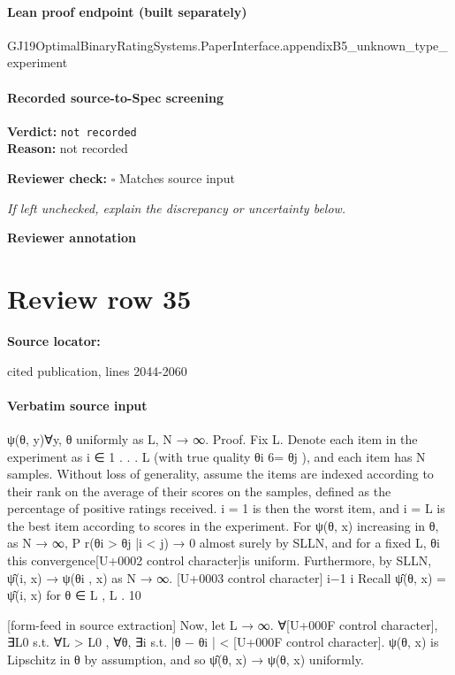 \documentclass[10pt]{article}
\newcommand{\reviewerbox}{%
  \par\noindent\fbox{\parbox{0.96\linewidth}{\rule{0pt}{0.38in}}}\par
}
\newcommand{\reviewmatch}[1]{%
  \par\noindent\textbf{Reviewer check:} $\square$\; #1\par
  \noindent\emph{If left unchecked, explain the discrepancy or uncertainty below.}\par
}
\begin{document}
\paragraph{Lean proof endpoint (built separately)}\begin{ReviewVerbatim}
GJ19OptimalBinaryRatingSystems.PaperInterface.appendixB5_unknown_type_experiment
\end{ReviewVerbatim}

\paragraph{Recorded source-to-Spec screening}
\textbf{Verdict:} \texttt{not recorded}
\\
\textbf{Reason:} not recorded
\reviewmatch{Matches source input}
\noindent\textbf{Reviewer annotation}\par
\reviewerbox
\clearpage
\hypertarget{source-claim-045f11cd1b489b98}{}
\section*{Review row 35}
\textbf{Source locator:} {\footnotesize\raggedright cited publication, lines 2044-\allowbreak{}2060\par}
\paragraph{Verbatim source input}
\begin{ReviewVerbatim}
ψ(θ, y)∀y, θ uniformly as L, N → ∞.
Proof. Fix L. Denote each item in the experiment as i ∈ {1 . . . L} (with true quality θi 6= θj ),
and each item has N samples. Without loss of generality, assume the items are indexed according
to their rank on the average of their scores on the samples, defined as the percentage of positive
ratings received. i = 1 is then the worst item, and i = L is the best item according to scores in the
experiment.
For ψ(θ, x) increasing in θ, as N → ∞, P r(θi > θj |i < j) → 0 almost surely by SLLN, and for
a fixed L, {θi } this convergence[U+0002 control character]is uniform.
Furthermore, by SLLN, ψ̂(i, x) → ψ(θi , x) as N → ∞.
[U+0003 control character]
i−1 i
Recall ψ̂(θ, x) = ψ̂(i, x) for θ ∈ L , L .
10


[form-feed in source extraction]
Now, let L → ∞. ∀[U+000F control character], ∃L0 s.t. ∀L > L0 , ∀θ, ∃i s.t. |θ − θi | < [U+000F control character]. ψ(θ, x) is Lipschitz in θ by
assumption, and so ψ̂(θ, x) → ψ(θ, x) uniformly.
\end{ReviewVerbatim}
\end{document}
